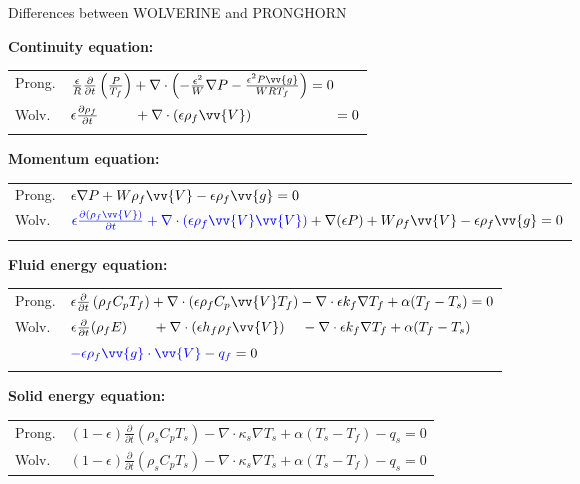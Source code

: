 \documentclass{beamer}
\begin{document}
\begin{frame}{Differences between WOLVERINE and PRONGHORN}

\textbf{Continuity equation:}

\begin{tabular}{l l}
Prong. & \(\frac{\epsilon}{R}\frac{\partial}{\partial t}\left(\frac{ P}{T_f}\right)+\nabla\cdot\left(-\frac{\epsilon^2}{W}\nabla P-\frac{\epsilon^2 P\vv{g}}{WRT_f}\right)=0\)\\
Wolv. & \(\epsilon\frac{\partial\rho_f}{\partial t} \hspace{0.9 cm}+ \nabla\cdot(\epsilon\rho_f\vv{V})\hspace{2.06 cm}=0\)\\\newline
\end{tabular}

\textbf{Momentum equation:}

\begin{tabular}{l l}
Prong. & \hspace{4.56 cm}\(\epsilon\nabla P+W\rho_f\vv{V}-\epsilon\rho_f\vv{g}=0\)\\
Wolv. & \(\color{blue}\epsilon\frac{\partial(\rho_f\vv{V})}{\partial t}+\nabla\cdot(\epsilon\rho_f\vv{V}\vv{V})\color{black}+\nabla(\epsilon P)+W\rho_f\vv{V}-\epsilon\rho_f\vv{g}=0 \)\\\newline
\end{tabular}

\textbf{Fluid energy equation:}

\begin{tabular}{l l}
Prong. &  \(\epsilon\frac{\partial}{\partial t} \left(\rho_f C_pT_f\right)+\nabla\cdot(\epsilon\rho_f C_p\vv{V}T_f)-\nabla\cdot\epsilon k_f\nabla T_f+\alpha(T_f-T_s)=0\)\\
Wolv. & \(\epsilon\frac{\partial}{\partial t}(\rho_f E)\hspace{0.64 cm}+\nabla\cdot(\epsilon h_f\rho_f\vv{V})\hspace{0.42 cm}-\nabla\cdot\epsilon k_f\nabla T_f +\alpha(T_f-T_s)\)\quad\\
& \hfill\(\color{blue}- \epsilon\rho_f \vv{g}\cdot\vv{V}\color{black}-\color{blue}q_f\color{black}=0\)\\\newline
\end{tabular}

\textbf{Solid energy equation:}

\begin{tabular}{l l}
Prong. & \((1-\epsilon)\frac{\partial}{\partial t} \left(\rho_s C_pT_s\right)-\nabla\cdot \kappa_s\nabla T_s+\alpha(T_s-T_f)-q_s=0\)\\
Wolv. & \((1-\epsilon)\frac{\partial}{\partial t} \left(\rho_s C_pT_s\right)-\nabla\cdot \kappa_s\nabla T_s+\alpha(T_s-T_f)-q_s=0\)\\
\end{tabular}

\end{frame}
\end{document}
